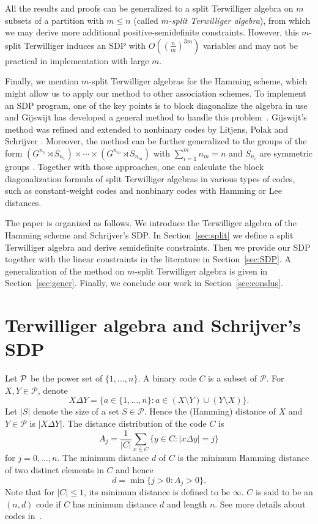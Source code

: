\documentclass[final,onecolumn]{IEEEtran}
\theoremstyle{definition}
\newcommand{\cP}{{\mathcal P}}
\begin{document}
All the results and proofs can be generalized to a split Terwilliger algebra on $m$ subsets of a partition with  $m \leq n$ (called \textit{$m$-split Terwilliger algebra}), from which we may derive more additional positive-semidefinite constraints.  
However, this $m$-split Terwilliger induces an SDP with  $O((\frac{n}{m})^{3m})$ variables and may not be practical in implementation with large $m$. 


Finally, we mention $m$-split Terwilliger algebras for the Hamming scheme, which might allow us to apply our method to other association schemes. To implement an SDP program, one of the key points is to block diagonalize the algebra in use
and  Gijswijt has developed a general method to handle this problem~\cite{Gij09}. Gijswijt's method was refined and extended to nonbinary codes by Litjens, Polak and Schrijver \cite{LPS17}. Moreover, the method can be further generalized to the groups of the form $(G^{n_{1}} \rtimes S_{n_{1}}) \times \cdots \times (G^{n_{m}} \rtimes S_{n_{m}})$ with $\sum_{i = 1}^{m}n_{m} = n$ and $S_{n_{i}}$ are symmetric groups \cite{Pol19_1}. Together with those approaches, one can calculate the block diagonalization formula of split Terwilliger algebras in various types of codes, such as constant-weight codes and nonbinary codes with Hamming or Lee distances.

	
The paper is organized as follows. We introduce the Terwilliger algebra  of the Hamming scheme and Schrijver’s SDP. In Section~\ref{sec:split} we define a split Terwilliger algebra and derive semidefinite constraints. Then we provide our SDP together with the linear constraints in the literature in Section~\ref{sec:SDP}. A generalization of the method on $m$-split Terwilliger algebra is given in Section~\ref{sec:gener}. Finally, we conclude our work in Section~\ref{sec:conslus}.

\section{Terwilliger algebra and Schrijver's SDP}


Let ${\cal P}$ be the power set of $\{1, \dots, n\}$. A binary code $C$ is a subset of $\cP$. For $X,Y \in \cP$, denote 
{
\begin{equation*}
    X\Delta Y= \{a\in\{1,\dots,n\}: a\in (X \setminus Y) \cup (Y \setminus X) \}.
\end{equation*}}
Let $\lvert S \rvert$ denote the size of a set $S \in \cP$. Hence the (Hamming) distance of $X$ and $Y \in \cP $ is  $\lvert X \Delta Y \rvert$. The distance distribution of the code $C$ is 
\begin{equation}
	A_{j} = \frac{1}{\lvert C \rvert} \sum_{x \in C}\{ y \in C : \lvert x \Delta y \rvert = j\} \label{eq:dist_distriubtion}
\end{equation}
for $j=0,\dots, n$. The minimum distance $d$ of $C$ is the minimum Hamming distance of two distinct elements in $C$ and hence 
$$d= \min\{j>0: A_j>0\}.$$
Note that for $\lvert C \rvert \leq 1$, its minimum distance   is defined to be $\infty$. $C$ is said to be an $(n,d)$ code if $C$ has minimum distance $d$ and length $n$. See more details about codes in~\cite{MS77}.
	
\end{document}
